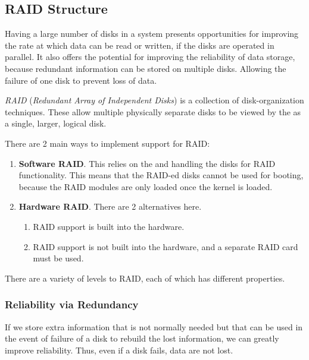 \subsection{RAID Structure}\label{subsec:RAID_Structure}
Having a large number of disks in a system presents opportunities for improving the rate at which data can be read or written, if the disks are operated in parallel.
It also offers the potential for improving the reliability of data storage, because redundant information can be stored on multiple disks.
Allowing the failure of one disk to prevent loss of data.

\begin{definition}[RAID]\label{def:RAID}
  \emph{RAID} (\emph{Redundant Array of Independent Disks}) is a collection of disk-organization techniques.
  These allow multiple physically separate disks to be viewed by the  as a single, larger, logical disk.

  There are 2 main ways to implement support for RAID:\@
  \begin{enumerate}[noitemsep]
  \item \textbf{Software RAID}.
    This relies on the  and  handling the disks for RAID functionality.
    This means that the RAID-ed disks cannot be used for booting, because the RAID modules are only loaded once the kernel is loaded.

  \item \textbf{Hardware RAID}.
    There are 2 alternatives here.
    \begin{enumerate}[noitemsep]
    \item RAID support is built into the hardware.
    \item RAID support is not built into the hardware, and a separate RAID card must be used.
    \end{enumerate}
  \end{enumerate}

  There are a variety of levels to RAID, each of which has different properties.
\end{definition}

\subsubsection{Reliability via Redundancy}\label{subsubsec:RAID_Reliability_Redundancy}
If we store extra information that is not normally needed but that can be used in the event of failure of a disk to rebuild the lost information, we can greatly improve reliability.
Thus, even if a disk fails, data are not lost.


